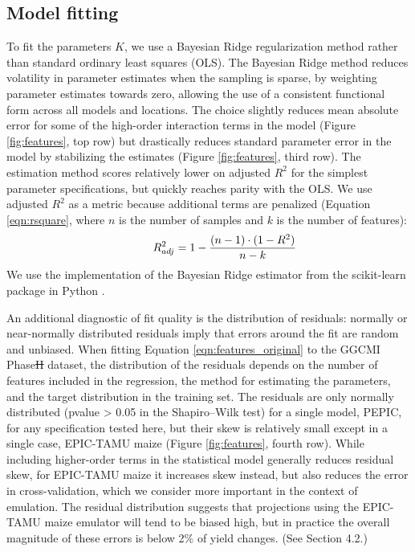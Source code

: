 \documentclass[gmdd]{copernicus} %
\providecommand{\DIFadd}[1]{{\protect\color{blue}\uwave{#1}}} %
\providecommand{\DIFdel}[1]{{\protect\color{red}\sout{#1}}}                      %
\providecommand{\DIFaddbegin}{} %
\providecommand{\DIFaddend}{} %
\providecommand{\DIFdelbegin}{} %
\providecommand{\DIFdelend}{} %
\begin{document}
\subsection{Model fitting}
To fit the parameters $K$, we use a Bayesian Ridge regularization method \citep{MacKay91} rather than standard ordinary least squares (OLS). 
The Bayesian Ridge method reduces volatility in parameter estimates when the sampling is sparse, by weighting parameter estimates towards zero, allowing the use of a consistent functional form across all models and locations. 
The choice slightly reduces mean absolute error for some of the high-order interaction terms in the model (Figure \ref{fig:features}, top row) but drastically reduces standard parameter error in the model by stabilizing the estimates (Figure \ref{fig:features}, third row).
The estimation method scores relatively lower on adjusted $R^2$ for the simplest parameter specifications, but quickly reaches parity with the OLS. 
We use adjusted $R^2$ as a metric because additional terms are penalized (Equation \ref{eqn:rsquare}, where $n$ is the number of samples and $k$ is the number of features): 
\begin{equation}
    \centering
    \label{eqn:rsquare}
        \hspace{10mm} R^{2}_{adj} = 1 - \frac{(n-1) \cdot (1 - R^{2})}{n - k}
\end{equation}
We use the implementation of the Bayesian Ridge estimator from the scikit-learn package in Python \citep{scikit-learn}. 

An additional diagnostic of fit quality is the distribution of residuals: normally or near-normally distributed residuals imply that errors around the fit are random and unbiased. 
When fitting Equation \ref{eqn:features_original} to the GGCMI Phase\DIFdelbegin \DIFdel{II }\DIFdelend \DIFaddbegin \DIFadd{~2 }\DIFaddend dataset, the distribution of the residuals depends on the number of features included in the regression, the method for estimating the parameters, and the target distribution in the training set. The residuals are only normally distributed (pvalue > 0.05 in the Shapiro–Wilk test) for a single model, PEPIC, for any specification tested here, but their skew is relatively small except in a single case, EPIC-TAMU maize (Figure \ref{fig:features}, fourth row).
While including higher-order terms in the statistical model generally reduces residual skew, for EPIC-TAMU maize it increases skew instead, but also reduces the error in cross-validation, which we consider more important in the context of emulation.
The residual distribution suggests that projections using the EPIC-TAMU maize emulator will tend to be biased high, but in practice the overall magnitude of these errors is below 2\% of yield changes. (See Section 4.2.)
\end{document}
